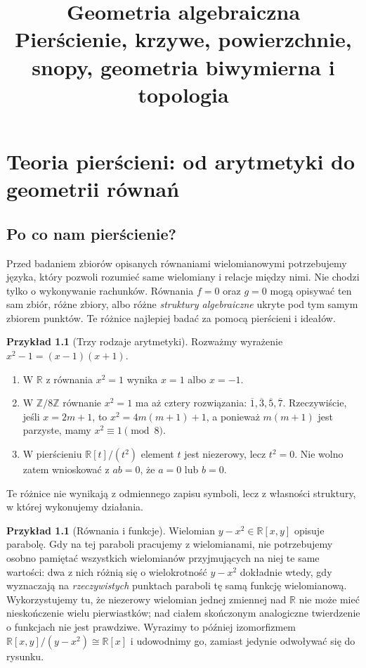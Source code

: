 \documentclass[11pt,a4paper,openany]{report}
\title{Geometria algebraiczna\\[3pt]\large Pierścienie, krzywe, powierzchnie, snopy, geometria biwymierna i topologia}
\author{}
\date{}
\numberwithin{equation}{section}
\theoremstyle{plain}
\theoremstyle{definition}
\newtheorem{przyklad}[twierdzenie]{Przykład}
\theoremstyle{remark}
\newcommand{\Z}{\mathbb Z}
\newcommand{\R}{\mathbb R}
\begin{document}
\hypersetup{pageanchor=false}
\maketitle
\hypersetup{pageanchor=true}
\tableofcontents
\clearpage
{}
\setcounter{chapter}{-1}

\chapter{Teoria pierścieni: od arytmetyki do geometrii równań}
\label{ch:pierscienie}
\section{Po co nam pierścienie?}

Przed badaniem zbiorów opisanych równaniami wielomianowymi potrzebujemy języka,
który pozwoli rozumieć same wielomiany i relacje między nimi. Nie chodzi tylko
 o wykonywanie rachunków. Równania $f=0$ oraz $g=0$ mogą opisywać ten sam zbiór,
różne zbiory, albo różne \emph{struktury algebraiczne} ukryte pod tym samym
zbiorem punktów. Te różnice najlepiej badać za pomocą pierścieni i ideałów.

\begin{przyklad}[Trzy rodzaje arytmetyki]
Rozważmy wyrażenie $x^2-1=(x-1)(x+1)$.
\begin{enumerate}[label=\arabic*)]
\item W $\R$ z równania $x^2=1$ wynika $x=1$ albo $x=-1$.
\item W $\Z/8\Z$ równanie $x^2=1$ ma aż cztery rozwiązania:
$\overline1,\overline3,\overline5,\overline7$.
Rzeczywiście, jeśli $x=2m+1$, to $x^2=4m(m+1)+1$, a ponieważ $m(m+1)$
jest parzyste, mamy $x^2\equiv1\pmod8$.
\item W pierścieniu $\R[t]/(t^2)$ element $t$ jest niezerowy, lecz
$t^2=0$. Nie wolno zatem wnioskować z $ab=0$, że $a=0$ lub $b=0$.
\end{enumerate}
Te różnice nie wynikają z odmiennego zapisu symboli, lecz z własności
struktury, w której wykonujemy działania.
\end{przyklad}

\begin{przyklad}[Równania i funkcje]
Wielomian $y-x^2\in\R[x,y]$ opisuje parabolę. Gdy na tej paraboli
pracujemy z wielomianami, nie potrzebujemy osobno pamiętać wszystkich
wielomianów przyjmujących na niej te same wartości: dwa z nich różnią się
o wielokrotność $y-x^2$ dokładnie wtedy, gdy wyznaczają na \emph{rzeczywistych}
punktach paraboli tę samą funkcję wielomianową. Wykorzystujemy tu, że
niezerowy wielomian jednej zmiennej nad $\R$ nie może mieć nieskończenie
wielu pierwiastków; nad ciałem skończonym analogiczne twierdzenie o funkcjach
nie jest prawdziwe. Wyrazimy to później izomorfizmem
$\R[x,y]/(y-x^2)\cong\R[x]$ i udowodnimy go, zamiast jedynie odwoływać się
do rysunku.
\end{przyklad}
\end{document}
